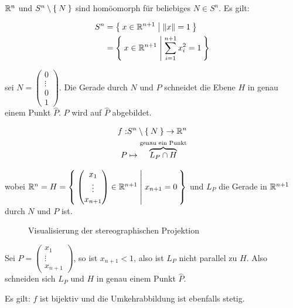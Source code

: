 \begin{beispiel}%
    $\mathbb{R}^n$ und $S^n \setminus \Set{N}$ sind homöomorph für
    beliebiges $N \in S^n$. Es gilt:

    \begin{align*}
        S^n &= \Set{x \in \ensuremath{\mathbb{R}}^{n+1} | \|x\| = 1}\\
            &= \Set{x \in \ensuremath{\mathbb{R}}^{n+1} | \sum_{i=1}^{n+1} x_i^2 = 1}
    \end{align*}
    
    \Obda sei $N = \begin{pmatrix}0\\ \vdots\\ 0\\1\end{pmatrix}$. Die
    Gerade durch $N$ und $P$ schneidet die Ebene $H$ in genau einem
    Punkt $\hat{P}$. $P$ wird auf $\hat{P}$ abgebildet.

    \begin{align*}
        f: &S^n \setminus \Set{N} \rightarrow \mathbb{R}^n\\
        P  &\mapsto \overbrace{L_P \cap H}^\text{genau ein Punkt}
    \end{align*}

    wobei $\mathbb{R}^n = H = \Set{\begin{pmatrix}x_1\\ \vdots \\ x_{n+1}\end{pmatrix} \in \ensuremath{\mathbb{R}}^{n+1} | x_{n+1} = 0}$
    und $L_P$ die Gerade in $\mathbb{R}^{n+1}$ durch $N$ und $P$ ist.

    \begin{figure}[htp]
        \centering
        \resizebox{0.9\linewidth}{!}{}
        \caption{Visualisierung der stereographischen Projektion}
        \label{fig:stereographic-projection}
    \end{figure}

    Sei $P = \begin{pmatrix}x_1\\ \vdots \\ x_{n+1}\end{pmatrix}$, so
    ist $x_{n+1} < 1$, also ist $L_P$ nicht parallel zu $H$. Also
    schneiden sich $L_P$ und $H$ in genau einem Punkt $\hat{P}$.

    Es gilt: $f$ ist bijektiv und die Umkehrabbildung ist ebenfalls
    stetig.    
\end{beispiel}
